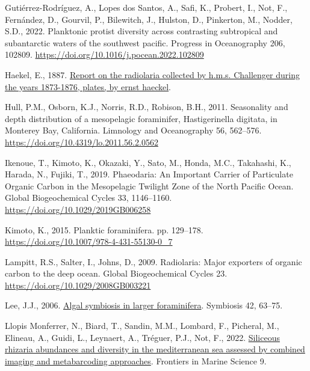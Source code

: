 \documentclass[
]{article}
\newlength{\cslhangindent}
\newlength{\cslentryspacingunit} %
\newenvironment{CSLReferences}[2] %
 {%
  \setlength{\parindent}{0pt}
  \ifodd #1
  \let\oldpar\par
  \def\par{\hangindent=\cslhangindent\oldpar}
  \fi
  \setlength{\parskip}{#2\cslentryspacingunit}
 }%
 {}
\begin{document}
\begin{CSLReferences}{1}{0}
\leavevmode{}%
Gutiérrez-Rodríguez, A., Lopes dos Santos, A., Safi, K., Probert, I.,
Not, F., Fernández, D., Gourvil, P., Bilewitch, J., Hulston, D.,
Pinkerton, M., Nodder, S.D., 2022. Planktonic protist diversity across
contrasting subtropical and subantarctic waters of the southwest
pacific. Progress in Oceanography 206, 102809.
\url{https://doi.org/10.1016/j.pocean.2022.102809}

\leavevmode{}%
Haekel, E., 1887.
\href{https://www.gutenberg.org/cache/epub/44527/pg44527-images.html}{Report
on the radiolaria collected by h.m.s. Challenger during the years
1873-1876, plates, by ernst haeckel}.

\leavevmode{}%
Hull, P.M., Osborn, K.J., Norris, R.D., Robison, B.H., 2011. Seasonality
and depth distribution of a mesopelagic foraminifer, Hastigerinella
digitata, in Monterey Bay, California. Limnology and Oceanography 56,
562--576. \url{https://doi.org/10.4319/lo.2011.56.2.0562}

\leavevmode{}%
Ikenoue, T., Kimoto, K., Okazaki, Y., Sato, M., Honda, M.C., Takahashi,
K., Harada, N., Fujiki, T., 2019. Phaeodaria: An Important Carrier of
Particulate Organic Carbon in the Mesopelagic Twilight Zone of the North
Pacific Ocean. Global Biogeochemical Cycles 33, 1146--1160.
\url{https://doi.org/10.1029/2019GB006258}

\leavevmode{}%
Kimoto, K., 2015. Planktic foraminifera. pp. 129--178.
\url{https://doi.org/10.1007/978-4-431-55130-0_7}

\leavevmode{}%
Lampitt, R.S., Salter, I., Johns, D., 2009. Radiolaria: Major exporters
of organic carbon to the deep ocean. Global Biogeochemical Cycles 23.
\url{https://doi.org/10.1029/2008GB003221}

\leavevmode{}%
Lee, J.J., 2006.
\href{https://dalspace.library.dal.ca/bitstream/handle/10222/78255/VOLUME\%2042-NUMBER\%202-2006-PAGE\%2063.pdf?sequence=1}{Algal
symbiosis in larger foraminifera}. Symbiosis 42, 63--75.

\leavevmode{}%
Llopis Monferrer, N., Biard, T., Sandin, M.M., Lombard, F., Picheral,
M., Elineau, A., Guidi, L., Leynaert, A., Tréguer, P.J., Not, F., 2022.
\href{https://www.frontiersin.org/articles/10.3389/fmars.2022.895995}{Siliceous
rhizaria abundances and diversity in the mediterranean sea assessed by
combined imaging and metabarcoding approaches}. Frontiers in Marine
Science 9.


\end{CSLReferences}
\end{document}
